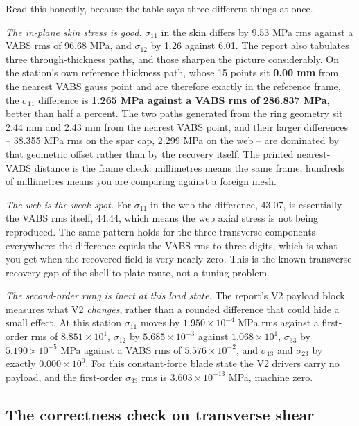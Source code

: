 Read this honestly, because the table says three different things at once.

\emph{The in-plane skin stress is good.} $\sigma_{11}$ in the skin differs by
9.53 MPa rms against a VABS rms of 96.68 MPa, and $\sigma_{12}$ by 1.26 against
6.01. The report also tabulates three through-thickness paths, and those
sharpen the picture considerably. On the station's own reference thickness path,
whose 15 points sit \textbf{0.00 mm} from the nearest VABS gauss point and are
therefore exactly in the reference frame, the $\sigma_{11}$ difference is
\textbf{1.265 MPa against a VABS rms of 286.837 MPa}, better than half a
percent. The two paths generated from the ring geometry sit 2.44 mm and 2.43 mm
from the nearest VABS point, and their larger differences -- 38.355 MPa rms on
the spar cap, 2.299 MPa on the web -- are dominated by that geometric offset
rather than by the recovery itself. The printed nearest-VABS distance is the
frame check: millimetres means the same frame, hundreds of millimetres means you
are comparing against a foreign mesh.

\emph{The web is the weak spot.} For $\sigma_{11}$ in the web the difference,
43.07, is essentially the VABS rms itself, 44.44, which means the web axial
stress is not being reproduced. The same pattern holds for the three transverse
components everywhere: the difference equals the VABS rms to three digits, which
is what you get when the recovered field is very nearly zero. This is the known
transverse recovery gap of the shell-to-plate route, not a tuning problem.

\emph{The second-order rung is inert at this load state.} The report's V2
payload block measures what V2 \emph{changes}, rather than a rounded difference
that could hide a small effect. At this station $\sigma_{11}$ moves by
$1.950\times10^{-4}$ MPa rms against a first-order rms of $8.851\times10^{1}$,
$\sigma_{12}$ by $5.685\times10^{-3}$ against $1.068\times10^{1}$,
$\sigma_{33}$ by $5.190\times10^{-5}$ MPa against a VABS rms of
$5.576\times10^{-2}$, and $\sigma_{13}$ and $\sigma_{23}$ by exactly
$0.000\times10^{0}$. For this constant-force blade state the V2 drivers carry no
payload, and the first-order $\sigma_{33}$ rms is $3.603\times10^{-13}$ MPa,
machine zero.

\subsection*{The correctness check on transverse shear}

